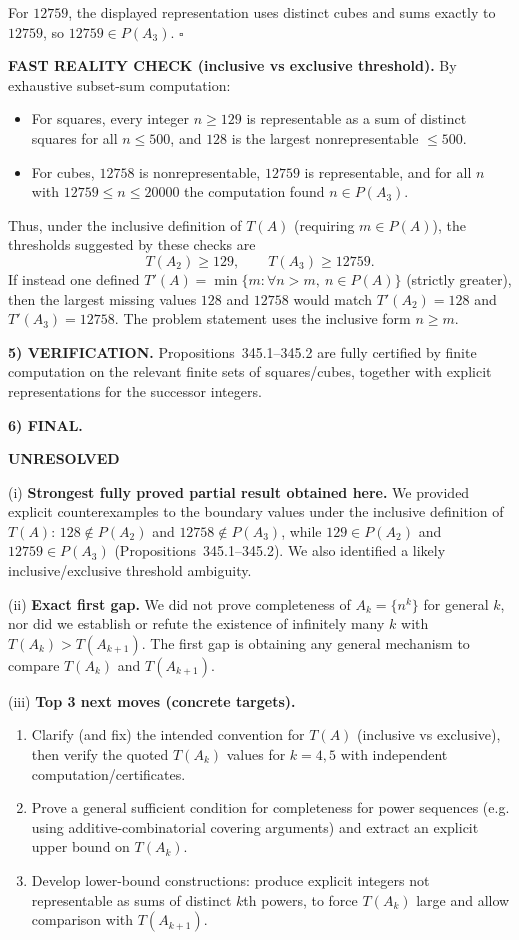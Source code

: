 For $12759$, the displayed representation uses distinct cubes and sums exactly to $12759$, so $12759\in P(A_3)$.
\hfill$\square$

\medskip
\noindent\textbf{FAST REALITY CHECK (inclusive vs exclusive threshold).}
By exhaustive subset-sum computation:
\begin{itemize}
\item For squares, every integer $n\ge 129$ is representable as a sum of distinct squares for all $n\le 500$, and $128$ is the largest nonrepresentable $\le 500$.
\item For cubes, $12758$ is nonrepresentable, $12759$ is representable, and for all $n$ with $12759\le n\le 20000$ the computation found $n\in P(A_3)$.
\end{itemize}
Thus, under the inclusive definition of $T(A)$ (requiring $m\in P(A)$), the thresholds suggested by these checks are
\[
T(A_2)\ge 129,\qquad T(A_3)\ge 12759.
\]
If instead one defined $T'(A)=\min\{m: \forall n>m,\ n\in P(A)\}$ (strictly greater), then the largest missing values $128$ and $12758$ would match $T'(A_2)=128$ and $T'(A_3)=12758$. The problem statement uses the inclusive form $n\ge m$.

\medskip
\noindent\textbf{5) VERIFICATION.}
Propositions~345.1--345.2 are fully certified by finite computation on the relevant finite sets of squares/cubes, together with explicit representations for the successor integers.

\medskip
\noindent\textbf{6) FINAL.}

\noindent\textbf{UNRESOLVED}

\smallskip
\noindent (i) \textbf{Strongest fully proved partial result obtained here.}
We provided explicit counterexamples to the boundary values under the inclusive definition of $T(A)$: $128\notin P(A_2)$ and $12758\notin P(A_3)$, while $129\in P(A_2)$ and $12759\in P(A_3)$ (Propositions~345.1--345.2). We also identified a likely inclusive/exclusive threshold ambiguity.

\smallskip
\noindent (ii) \textbf{Exact first gap.}
We did not prove completeness of $A_k=\{n^k\}$ for general $k$, nor did we establish or refute the existence of infinitely many $k$ with $T(A_k)>T(A_{k+1})$. The first gap is obtaining any general mechanism to compare $T(A_k)$ and $T(A_{k+1})$.

\smallskip
\noindent (iii) \textbf{Top 3 next moves (concrete targets).}
\begin{enumerate}
\item Clarify (and fix) the intended convention for $T(A)$ (inclusive vs exclusive), then verify the quoted $T(A_k)$ values for $k=4,5$ with independent computation/certificates.
\item Prove a general sufficient condition for completeness for power sequences (e.g. using additive-combinatorial covering arguments) and extract an explicit upper bound on $T(A_k)$.
\item Develop lower-bound constructions: produce explicit integers not representable as sums of distinct $k$th powers, to force $T(A_k)$ large and allow comparison with $T(A_{k+1})$.
\end{enumerate}

